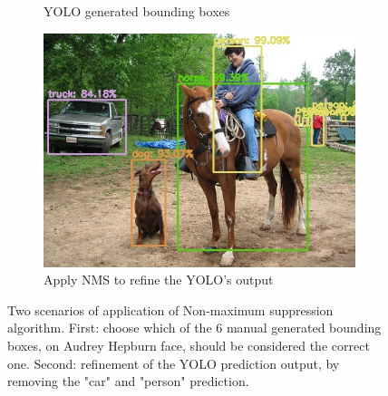 \begin{figure}[!h]
\begin{subfigure}{.35\linewidth}
		\caption{YOLO generated bounding boxes}
		\label{fig:sub_noNMS_yolo}
	\end{subfigure}
	\begin{subfigure}{.35\linewidth}
		\includegraphics[width=0.9\linewidth]{images/detection/ex2_yolo}
		\caption{Apply NMS to refine the YOLO's output}
		\label{fig:sub_withNMS_yolo}
	\end{subfigure}
	\caption{Two scenarios of application of Non-maximum suppression algorithm. First: choose which of the 6 manual generated bounding boxes, on Audrey Hepburn face, should be considered the correct one. Second: refinement of the YOLO prediction output, by removing the "car" and "person" prediction.}
	\label{fig:nms}
\end{figure}


